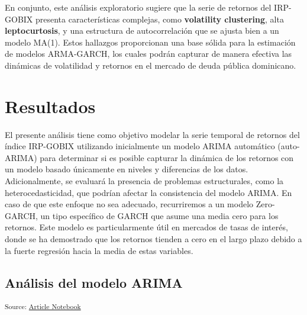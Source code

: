 \documentclass[
  number,
  preprint,
  3p,
  onecolumn]{elsarticle}
\begin{document}
En conjunto, este análisis exploratorio sugiere que la serie de retornos
del IRP-GOBIX presenta características complejas, como
\textbf{volatility clustering}, alta \textbf{leptocurtosis}, y una
estructura de autocorrelación que se ajusta bien a un modelo MA(1).
Estos hallazgos proporcionan una base sólida para la estimación de
modelos ARMA-GARCH, los cuales podrán capturar de manera efectiva las
dinámicas de volatilidad y retornos en el mercado de deuda pública
dominicano.

\section{Resultados}\label{resultados}

El presente análisis tiene como objetivo modelar la serie temporal de
retornos del índice IRP-GOBIX utilizando inicialmente un modelo ARIMA
automático (auto-ARIMA) para determinar si es posible capturar la
dinámica de los retornos con un modelo basado únicamente en niveles y
diferencias de los datos. Adicionalmente, se evaluará la presencia de
problemas estructurales, como la heterocedasticidad, que podrían afectar
la consistencia del modelo ARIMA. En caso de que este enfoque no sea
adecuado, recurriremos a un modelo Zero-GARCH, un tipo específico de
GARCH que asume una media cero para los retornos. Este modelo es
particularmente útil en mercados de tasas de interés, donde se ha
demostrado que los retornos tienden a cero en el largo plazo debido a la
fuerte regresión hacia la media de estas variables.

\subsection{Análisis del modelo
ARIMA}\label{anuxe1lisis-del-modelo-arima}

\textsubscript{Source:
\href{https://iancont.github.io/fixed_income_garch/index-preview.html}{Article
Notebook}}
\end{document}
